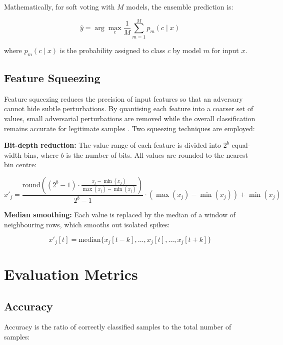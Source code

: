 \documentclass[12pt,a4paper,oneside]{report}
\begin{document}
Mathematically, for soft voting with $M$ models, the ensemble prediction is:

\begin{equation}
    \label{eq:ensemble}
    \hat{y} = \arg\max_{c} \frac{1}{M} \sum_{m=1}^{M} p_m(c \mid x)
\end{equation}

\noindent where $p_m(c \mid x)$ is the probability assigned to class $c$ by model $m$ for input $x$.

\subsection{Feature Squeezing}

Feature squeezing reduces the precision of input features so that an adversary cannot hide subtle perturbations. By quantising each feature into a coarser set of values, small adversarial perturbations are removed while the overall classification remains accurate for legitimate samples \cite{xu2018feature}. Two squeezing techniques are employed:

\textbf{Bit-depth reduction:} The value range of each feature is divided into $2^b$ equal-width bins, where $b$ is the number of bits. All values are rounded to the nearest bin centre:

\begin{equation}
    \label{eq:bitdepth}
    x'_j = \frac{\text{round}\left((2^b - 1) \cdot \frac{x_j - \min(x_j)}{\max(x_j) - \min(x_j)}\right)}{2^b - 1} \cdot (\max(x_j) - \min(x_j)) + \min(x_j)
\end{equation}

\textbf{Median smoothing:} Each value is replaced by the median of a window of neighbouring rows, which smooths out isolated spikes:

\begin{equation}
    \label{eq:median}
    x'_j[t] = \text{median}\{x_j[t - k], \dots, x_j[t], \dots, x_j[t + k]\}
\end{equation}

\section{Evaluation Metrics}

\subsection{Accuracy}

Accuracy is the ratio of correctly classified samples to the total number of samples:
\end{document}
